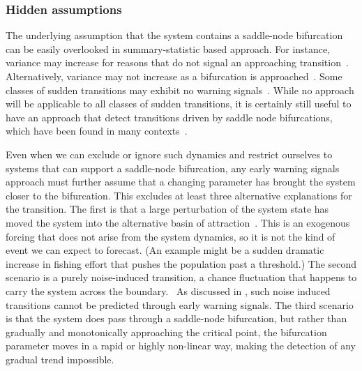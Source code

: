 \documentclass[authoryear,review,11pt]{elsarticle}
\begin{document}
\subsubsection*{Hidden assumptions}
The underlying assumption that the system contains a saddle-node bifurcation
can be easily overlooked in summary-statistic based approach.  
For instance, variance may increase for reasons that 
do not signal an approaching transition~\citep{Schreiber2003, Schreiber2008}.
Alternatively, variance may not increase as a bifurcation is approached~\citep{Livina2012, Dakos2011a}.
Some classes of sudden transitions may exhibit no warning signals~\cite{Hastings2010}.   
While no approach will be applicable to all classes of sudden transitions,
it is certainly still useful to have an approach that detect transitions driven by 
saddle node bifurcations, which have been found in many contexts~\citep[\emph{e.g.}, see][]{Scheffer2001}.  


Even when we can exclude or ignore such dynamics and 
restrict ourselves to systems that can support a saddle-node bifurcation,
any early warning signals approach must further assume that a changing parameter 
has brought the system closer to the bifurcation.  This excludes at least three alternative
explanations for the transition.  
The first is that a large perturbation of the system state 
has moved the system into the alternative basin of attraction~\citep{Scheffer2001, Scheffer2001}.  
This is an exogenous forcing that does not arise from the system dynamics, so it is not the kind of event we can expect to forecast. 
(An example might be a sudden dramatic increase in fishing effort that pushes the population past a threshold.)
The second scenario is a purely noise-induced transition, a chance fluctuation that happens to carry the system across the boundary.~\citep{Ditlevsen2010}  
As discussed in \citet{Livina2012}, such noise induced transitions cannot be predicted through early warning signals.  
The third scenario is that the system does pass through a saddle-node bifurcation, 
but rather than gradually and monotonically approaching the critical point, the 
bifurcation parameter moves in a rapid or highly non-linear way, making the detection of any gradual trend impossible.  

\end{document}

